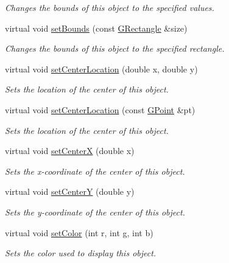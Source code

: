 \begin{DoxyCompactItemize}
\begin{DoxyCompactList}\small\item\em Changes the bounds of this object to the specified values. \end{DoxyCompactList}\item 
virtual void \mbox{\hyperlink{classGObject_acada386653f008cacc7cce86426bef7c}{set\+Bounds}} (const \mbox{\hyperlink{classGRectangle}{G\+Rectangle}} \&size)
\begin{DoxyCompactList}\small\item\em Changes the bounds of this object to the specified rectangle. \end{DoxyCompactList}\item 
virtual void \mbox{\hyperlink{classGObject_a290b47dd8de1be44089f95cb2c47c1de}{set\+Center\+Location}} (double x, double y)
\begin{DoxyCompactList}\small\item\em Sets the location of the center of this object. \end{DoxyCompactList}\item 
virtual void \mbox{\hyperlink{classGObject_a1bedf1b233ecba3f753ec58908a683a6}{set\+Center\+Location}} (const \mbox{\hyperlink{classGPoint}{G\+Point}} \&pt)
\begin{DoxyCompactList}\small\item\em Sets the location of the center of this object. \end{DoxyCompactList}\item 
virtual void \mbox{\hyperlink{classGObject_a2f4936281e056eead00a9186b9ba8af6}{set\+CenterX}} (double x)
\begin{DoxyCompactList}\small\item\em Sets the x-\/coordinate of the center of this object. \end{DoxyCompactList}\item 
virtual void \mbox{\hyperlink{classGObject_aad2a22b4fde88c33306b92aebf641d57}{set\+CenterY}} (double y)
\begin{DoxyCompactList}\small\item\em Sets the y-\/coordinate of the center of this object. \end{DoxyCompactList}\item 
virtual void \mbox{\hyperlink{classGObject_ad57ef49bc31db94e92648aa3737923d6}{set\+Color}} (int r, int g, int b)
\begin{DoxyCompactList}\small\item\em Sets the color used to display this object. \end{DoxyCompactList}\item 

\end{DoxyCompactItemize}
